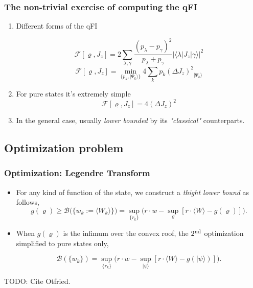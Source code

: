 \documentclass{beamer}
\newcommand{\ket}[1]{\ensuremath{\vert #1 \rangle}}
\newcommand{\braOket}[3]{\ensuremath{\langle #1 \vert #2 \vert #3 \rangle}}
\newcommand{\expect}[1]{\ensuremath{\langle #1 \rangle}}
\newcommand{\varian}[1]{\ensuremath{\left(\Delta #1 \right)^2}}
\begin{document}
	\begin{frame}
		\frametitle{The non-trivial exercise of computing the qFI}

		\begin{enumerate}
			\item<1-> Different forms of the qFI
				\begin{block}
					{}
					\small
					\[
						\mathcal{F}[\varrho,J_z]=2 \sum_{\lambda,\gamma} \frac{(p_\lambda-p_\gamma)^2}{p_\lambda+p_\gamma} |\braOket{\lambda}{J_z}{\gamma}|^2
					\]
					\[
					  \mathcal{F}[\varrho,J_z]=\min_{\{p_k,\ket{\Psi_k}\}} 4\sum_k p_k \varian{J_z}_{\ket{\Psi_k}}
					\]
				\end{block}

			\item<2-> For pure states it's extremely simple
				{\small
				\[
					\mathcal{F}[\varrho,J_z] = 4\varian{J_z}
				\]
				}
			\item<3-> In the general case, usually \emph{\color{blue} lower bounded} by its \emph{"classical"} counterparts.

		\end{enumerate}

	\end{frame}

	\subsection{Optimization problem}

		\begin{frame}
			\frametitle{Optimization: Legendre Transform}
			\begin{itemize}
				\item For any kind of function of the state, we construct a \emph{thight lower bound} as follows,
					{\small \[
					g(\varrho) \geq
					\mathcal{B} \big( \{w_k := \expect{W_k}\} \big) = \sup_{\{r_k\}} \big( r \cdot w - \sup_{\varrho} [ r\cdot\expect{W} - g(\varrho) ] \big).
					\]}
				\item When $g(\varrho)$ is the infimum over the convex roof, the $2^{\rm nd}$ optimization simplified to pure states only,
					\begin{block}
						{}
						{\small
						\vspace{8px}
						\[
						\mathcal{B}(\{w_k\}) = \sup_{\{r_k\}} \big( r\cdot w - \sup_{\ket{\psi}} [ r\cdot\expect{W} - g(\ket{\psi}) ] \big).
						\]}
					\end{block}
			\end{itemize}

			TODO: Cite Otfried.

		\end{frame}
\end{document}
